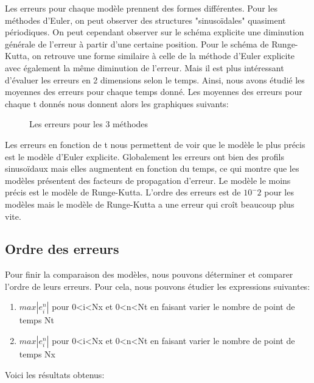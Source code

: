 Les erreurs pour chaque modèle prennent des formes différentes.
Pour les méthodes d'Euler, on peut observer des structures "sinusoïdales" quasiment périodiques. On peut cependant observer sur le schéma explicite une diminution générale de l'erreur à partir d'une certaine position.
Pour le schéma de Runge-Kutta, on retrouve une forme similaire à celle de la méthode d'Euler explicite avec également la même diminution de l'erreur.
\newline
Mais il est plus intéressant d'évaluer les erreurs en 2 dimensions selon le temps. Ainsi, nous avons étudié les moyennes des erreurs pour chaque temps donné.
\newline
Les moyennes des erreurs pour chaque t donnés nous donnent alors les graphiques suivants:

\begin{figure}[H]
\begin{center}
\centering{}
\caption{Les erreurs pour les 3 méthodes\label{fig1}}
\end{center}
\end{figure}

Les erreurs en fonction de t nous permettent de voir que le modèle le plus précis est le modèle d'Euler explicite.
\newline
Globalement les erreurs ont bien des profils sinusoïdaux mais elles augmentent en fonction du temps, ce qui montre que les modèles présentent des facteurs de propagation d'erreur.
Le modèle le moins précis est le modèle de Runge-Kutta.
\newline
L'ordre des erreurs est de $10^-2$ pour les modèles mais le modèle de Runge-Kutta a une erreur qui croît beaucoup plus vite.

\subsection{Ordre des erreurs}
Pour finir la comparaison des modèles, nous pouvons déterminer et comparer l'ordre de leurs erreurs.
Pour cela, nous pouvons étudier les expressions suivantes:
\begin{enumerate}
    \item $max|e^n_{i}|$ pour 0<i<Nx et 0<n<Nt en faisant varier le nombre de point de temps Nt
    \item $max|e^n_{i}|$ pour 0<i<Nx et 0<n<Nt en faisant varier le nombre de point de temps Nx
\end{enumerate}

Voici les résultats obtenus:

